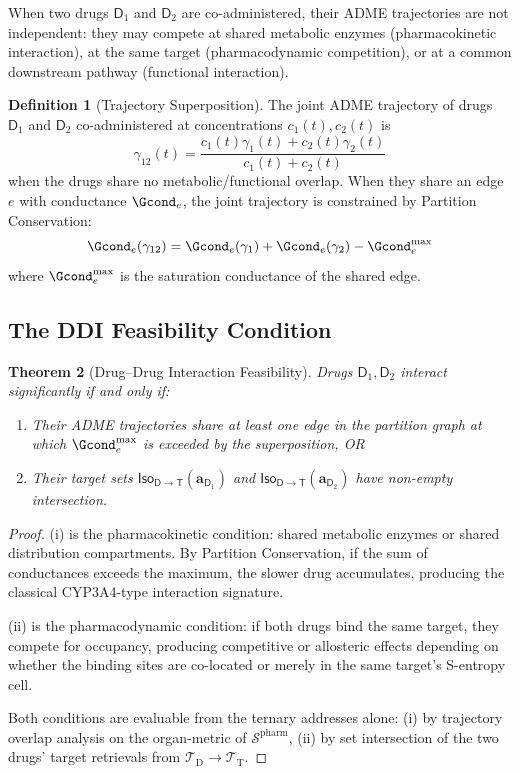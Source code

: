 \documentclass[11pt,twocolumn,a4paper]{article}
\newtheorem{theorem}{Theorem}[section]
\theoremstyle{definition}
\newtheorem{definition}[theorem]{Definition}
\theoremstyle{remark}
\newcommand{\Sspace}{\mathcal{S}}
\newcommand{\Trie}{\mathcal{T}}
\newcommand{\Dtrie}{\Trie_{\mathrm{D}}}
\newcommand{\Ttrie}{\Trie_{\mathrm{T}}}
\newcommand{\Drug}{\mathsf{D}}
\newcommand{\Target}{\mathsf{T}}
\newcommand{\Iso}{\mathsf{Iso}}
\newcommand{\drugaddr}{\mathbf{a}_\Drug}
\begin{document}
When two drugs $\Drug_1$ and $\Drug_2$ are co-administered, their ADME trajectories are not independent: they may compete at shared metabolic enzymes (pharmacokinetic interaction), at the same target (pharmacodynamic competition), or at a common downstream pathway (functional interaction).

\begin{definition}[Trajectory Superposition]
\label{def:traj_superposition}
The joint ADME trajectory of drugs $\Drug_1$ and $\Drug_2$ co-administered at concentrations $c_1(t), c_2(t)$ is
\begin{equation}
\gamma_{12}(t) = \frac{c_1(t) \gamma_1(t) + c_2(t) \gamma_2(t)}{c_1(t) + c_2(t)}
\end{equation}
when the drugs share no metabolic/functional overlap. When they share an edge $e$ with conductance $\Gcond_e$, the joint trajectory is constrained by Partition Conservation:
\begin{equation}
\Gcond_e(\gamma_{12}) = \Gcond_e(\gamma_1) + \Gcond_e(\gamma_2) - \Gcond_e^{\max}
\end{equation}
where $\Gcond_e^{\max}$ is the saturation conductance of the shared edge.
\end{definition}

\subsection{The DDI Feasibility Condition}

\begin{theorem}[Drug--Drug Interaction Feasibility]
\label{thm:ddi}
Drugs $\Drug_1, \Drug_2$ interact significantly if and only if:
\begin{enumerate}[nosep,label=(\roman*)]
\item Their ADME trajectories share at least one edge in the partition graph at which $\Gcond_e^{\max}$ is exceeded by the superposition, OR
\item Their target sets $\Iso_{\Drug \to \Target}(\drugaddr_1)$ and $\Iso_{\Drug \to \Target}(\drugaddr_2)$ have non-empty intersection.
\end{enumerate}
\end{theorem}

\begin{proof}
(i) is the pharmacokinetic condition: shared metabolic enzymes or shared distribution compartments. By Partition Conservation, if the sum of conductances exceeds the maximum, the slower drug accumulates, producing the classical CYP3A4-type interaction signature.

(ii) is the pharmacodynamic condition: if both drugs bind the same target, they compete for occupancy, producing competitive or allosteric effects depending on whether the binding sites are co-located or merely in the same target's S-entropy cell.

Both conditions are evaluable from the ternary addresses alone: (i) by trajectory overlap analysis on the organ-metric of $\Sspace^{\mathrm{pharm}}$, (ii) by set intersection of the two drugs' target retrievals from $\Dtrie \to \Ttrie$.
\end{proof}
\end{document}
